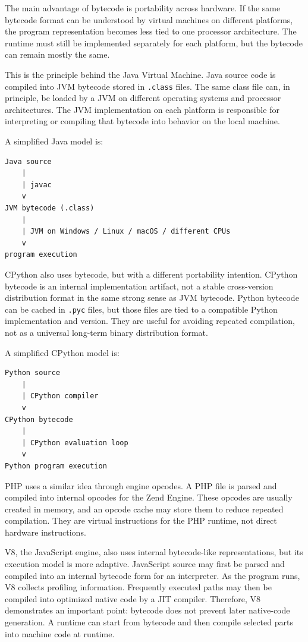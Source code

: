 The main advantage of bytecode is portability across hardware. If the same bytecode format can be understood by virtual machines on different platforms, the program representation becomes less tied to one processor architecture. The runtime must still be implemented separately for each platform, but the bytecode can remain mostly the same.

This is the principle behind the Java Virtual Machine. Java source code is compiled into JVM bytecode stored in \texttt{.class} files. The same class file can, in principle, be loaded by a JVM on different operating systems and processor architectures. The JVM implementation on each platform is responsible for interpreting or compiling that bytecode into behavior on the local machine.

A simplified Java model is:

\begin{verbatim}
Java source
    |
    | javac
    v
JVM bytecode (.class)
    |
    | JVM on Windows / Linux / macOS / different CPUs
    v
program execution
\end{verbatim}

CPython also uses bytecode, but with a different portability intention. CPython bytecode is an internal implementation artifact, not a stable cross-version distribution format in the same strong sense as JVM bytecode. Python bytecode can be cached in \texttt{.pyc} files, but those files are tied to a compatible Python implementation and version. They are useful for avoiding repeated compilation, not as a universal long-term binary distribution format.

A simplified CPython model is:

\begin{verbatim}
Python source
    |
    | CPython compiler
    v
CPython bytecode
    |
    | CPython evaluation loop
    v
Python program execution
\end{verbatim}

PHP uses a similar idea through engine opcodes. A PHP file is parsed and compiled into internal opcodes for the Zend Engine. These opcodes are usually created in memory, and an opcode cache may store them to reduce repeated compilation. They are virtual instructions for the PHP runtime, not direct hardware instructions.

V8, the JavaScript engine, also uses internal bytecode-like representations, but its execution model is more adaptive. JavaScript source may first be parsed and compiled into an internal bytecode form for an interpreter. As the program runs, V8 collects profiling information. Frequently executed paths may then be compiled into optimized native code by a JIT compiler. Therefore, V8 demonstrates an important point: bytecode does not prevent later native-code generation. A runtime can start from bytecode and then compile selected parts into machine code at runtime.

